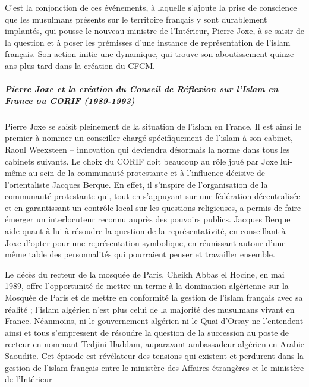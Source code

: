 C'est la conjonction de ces événements, à laquelle s'ajoute la prise de
conscience que les musulmans présents sur le territoire français y sont
durablement implantés, qui pousse le nouveau ministre de l'Intérieur,
Pierre Joxe, à se saisir de la question et à poser les prémisses d'une
instance de représentation de l'islam français. Son action initie une
dynamique, qui trouve son aboutissement quinze ans plus tard dans la
création du CFCM.


\hypertarget{pierre-joxe-et-la-cruxe9ation-du-conseil-de-ruxe9flexion-sur-lislam-en-france-ou-corif-1989-1993}{%
\subparagraph{Pierre Joxe et la création du Conseil de Réflexion sur
l'Islam en France ou CORIF
(1989-1993)}\label{pierre-joxe-et-la-cruxe9ation-du-conseil-de-ruxe9flexion-sur-lislam-en-france-ou-corif-1989-1993}}


Pierre Joxe se saisit pleinement de la situation de l'islam en France.
Il est ainsi le premier à nommer un conseiller chargé spécifiquement de
l'islam à son cabinet, Raoul Weexsteen -- innovation qui deviendra
désormais la norme dans tous les cabinets suivants. Le choix du CORIF
doit beaucoup au rôle joué par Joxe lui-même au sein de la communauté
protestante et à l'influence décisive de l'orientaliste Jacques Berque.
En effet, il s'inspire de l'organisation de la communauté protestante
qui, tout en s'appuyant sur une fédération décentralisée et en
garantissant un contrôle local sur les questions religieuses, a permis
de faire émerger un interlocuteur reconnu auprès des pouvoirs publics.
Jacques Berque aide quant à lui à résoudre la question de la
représentativité, en conseillant à Joxe d'opter pour une représentation
symbolique, en réunissant autour d'une même table des personnalités qui
pourraient penser et travailler ensemble.

Le décès du recteur de la mosquée de Paris, Cheikh Abbas el Hocine, en
mai 1989, offre l'opportunité de mettre un terme à la domination
algérienne sur la Mosquée de Paris et de mettre en conformité la gestion
de l'islam français avec sa réalité ; l'islam algérien n'est plus celui
de la majorité des musulmans vivant en France. Néanmoins, ni le
gouvernement algérien ni le Quai d'Orsay ne l'entendent ainsi et tous
s'empressent de résoudre la question de la succession au poste de
recteur en nommant Tedjini Haddam, auparavant ambassadeur algérien en
Arabie Saoudite. Cet épisode est révélateur des tensions qui existent et
perdurent dans la gestion de l'islam français entre le ministère des
Affaires étrangères et le ministère de l'Intérieur

